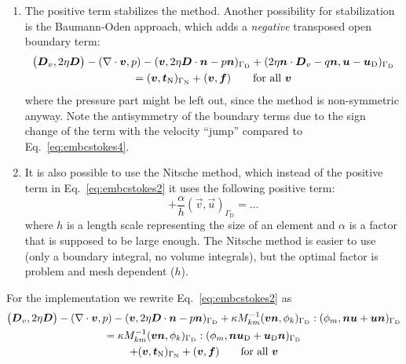 \begin{enumerate}
\begin{multline}
u_\text{D})+(\vec u-\vec u_\text{D})\vec n])_{\Gamma_\text{D}}\\
=(\vek v,\vek t_{\text{N}})_{\Gamma_{\text{N}}}+(\vek v,\vek f)
\qquad\text{for all }\vek v
\label{eq:embcstokes4}
\end{multline}
Note, that $\ten D_v=(\nabla\vek v+\nabla\vek v^T)/2$.
Contrary to what would
be expected, the non-symmetric method is more stable than the symmetric method
for lower values of $\kappa$ \cite{Choi11}.
   \item The positive term stabilizes the method. Another possibility for
stabilization is the Baumann-Oden approach, which adds a \emph{negative}
         transposed open
         boundary term:
\begin{multline}
  \big(\boldsymbol{D}_v,2\eta\boldsymbol{D}\big)
    -(\nabla\cdot\boldsymbol{v},p)
    -(\boldsymbol{v},2\eta \boldsymbol{D}\cdot\boldsymbol{n}-p\boldsymbol{n})_{\Gamma_{\text{D}}}
+(2\eta \boldsymbol{n}\cdot\boldsymbol{D}_v-q\boldsymbol{n},\boldsymbol{u}-\boldsymbol{u}_\text{D})_{\Gamma_{\text{D}}}\\
=(\boldsymbol{v},\boldsymbol{t}_{\text{N}})_{\Gamma_{\text{N}}}+(\boldsymbol{v},\boldsymbol{f})
\qquad\text{for all }\boldsymbol{v}
\label{eq:embcstokes6}
\end{multline}
where the pressure part might be left out, since the method is non-symmetric
anyway.
Note the antisymmetry of the boundary terms due to the sign change of the term
with the velocity ``jump'' compared to Eq.~\eqref{eq:embcstokes4}.
\item
It is also possible to use the
Nitsche method, which instead of the positive term in
Eq.~\eqref{eq:embcstokes2}
it uses the following positive term:
\begin{equation}
   + \frac\alpha{h}(\vec v, \vec u)_{\Gamma_\text{D}} = \ldots
\label{eq:embcNitsche}
\end{equation}
where $h$ is a length scale representing the size of an element and
$\alpha$ is a factor that is supposed to be large enough. The Nitsche method is
easier to use (only a boundary integral, no volume integrals), but the optimal
factor is problem and mesh dependent ($h$).

\end{enumerate}
For the implementation we rewrite Eq.~\eqref{eq:embcstokes2} as
\begin{multline}
  \big(\ten D_v,2\eta\ten D\big)
    -(\nabla\cdot\vek v,p)
    -(\vek v,2\eta \ten D\cdot\vec n-p\vec n)_{\Gamma_{\text{D}}}%
 +\kappa M_{km}^{-1}(\vec v\vec n,\phi_k)_{\Gamma_\text{D}}:(\phi_m,\vek n\vec u
+\vec u\vec n)_{\Gamma_\text{D}}\\
 =\kappa M_{km}^{-1}(\vec v\vec n,\phi_k)_{\Gamma_\text{D}}:(\phi_m,\vek n\vec
u_\text{D}+\vec u_\text{D}\vec n)_{\Gamma_\text{D}}\\
+(\vek v,\vek t_{\text{N}})_{\Gamma_{\text{N}}}+(\vek v,\vek f)
\qquad\text{for all }\vek v
\label{eq:embcstokes3}
\end{multline}

